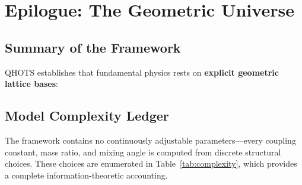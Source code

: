 \documentclass[aps,prd,twocolumn,superscriptaddress,floatfix,nofootinbib]{revtex4-2}
\theoremstyle{definition}
\theoremstyle{remark}
\begin{document}
\section{Epilogue: The Geometric Universe}

\subsection{Summary of the Framework}

QHOTS establishes that fundamental physics rests on \textbf{explicit geometric lattice bases}:

\begin{center}
\end{center}

\subsection{Model Complexity Ledger}
\label{sec:complexity}

The framework contains no continuously adjustable parameters---every coupling
constant, mass ratio, and mixing angle is computed from discrete structural
choices.  These choices are enumerated in Table~\ref{tab:complexity}, which
provides a complete information-theoretic accounting.
\end{document}
